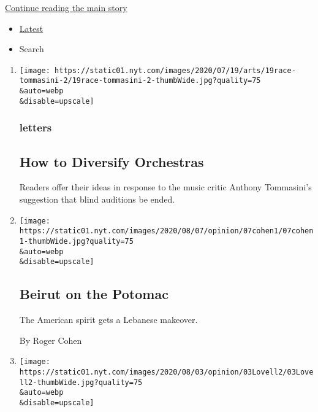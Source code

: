 \protect\hyperlink{after-mid1}{Continue reading the main story}

\begin{itemize}
\tightlist
\item
  \protect\hyperlink{stream-panel}{Latest}
\item
  Search
\end{itemize}

\begin{enumerate}
\def\labelenumi{\arabic{enumi}.}
\item
  \href{/2020/08/08/opinion/letters/orchestras-race-diversity.html}{}

  \texttt{[image: https://static01.nyt.com/images/2020/07/19/arts/19race-tommasini-2/19race-tommasini-2-thumbWide.jpg?quality=75\\\&auto=webp\\\&disable=upscale]}

  \hypertarget{letters}{%
  \subsubsection{letters}\label{letters}}

  \hypertarget{how-to-diversify-orchestras}{%
  \subsection{How to Diversify
  Orchestras}\label{how-to-diversify-orchestras}}

  Readers offer their ideas in response to the music critic Anthony
  Tommasini's suggestion that blind auditions be ended.
\item
  \href{/2020/08/07/opinion/beirut-explosion.html}{}

  \texttt{[image: https://static01.nyt.com/images/2020/08/07/opinion/07cohen1/07cohen1-thumbWide.jpg?quality=75\\\&auto=webp\\\&disable=upscale]}

  \hypertarget{beirut-on-the-potomac}{%
  \subsection{Beirut on the Potomac}\label{beirut-on-the-potomac}}

  The American spirit gets a Lebanese makeover.

  By Roger Cohen
\item
  \href{/2020/08/07/opinion/letters/portland-police.html}{}

  \texttt{[image: https://static01.nyt.com/images/2020/08/03/opinion/03Lovell2/03Lovell2-thumbWide.jpg?quality=75\\\&auto=webp\\\&disable=upscale]}


\end{enumerate}
